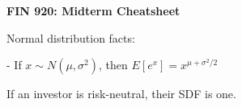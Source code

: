 \documentclass{article}
\begin{document}
\textbf{FIN 920: Midterm Cheatsheet}

Normal distribution facts:

- If $x \sim N(\mu, \sigma^2)$, then $E[e^x] = x^{\mu + \sigma^2/2}$


If an investor is risk-neutral, their SDF is one.
\end{document}
